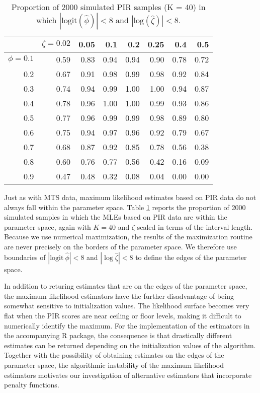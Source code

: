 \documentclass[man, noextraspace, floatsintext]{apa6}\usepackage[]{graphicx}\usepackage[]{color}
\newcommand{\logit}{\text{logit}}
\begin{document}
\begin{table}[b]
\centering
\caption{Proportion of 2000 simulated PIR samples (K = 40) in which  $|\text{logit}(\hat\phi)| < 8$ and $|\text{log}(\hat\zeta)| < 8$.} 
\label{tab:PIR_ests_valid}
\begin{tabular}{rrrrrrrr}
  \hline
 & $\zeta = 0.02$ & 0.05 & 0.1 & 0.2 & 0.25 & 0.4 & 0.5 \\ 
  \hline
$\phi = 0.1$ & 0.59 & 0.83 & 0.94 & 0.94 & 0.90 & 0.78 & 0.72 \\ 
  0.2 & 0.67 & 0.91 & 0.98 & 0.99 & 0.98 & 0.92 & 0.84 \\ 
  0.3 & 0.74 & 0.94 & 0.99 & 1.00 & 1.00 & 0.94 & 0.87 \\ 
  0.4 & 0.78 & 0.96 & 1.00 & 1.00 & 0.99 & 0.93 & 0.86 \\ 
  0.5 & 0.77 & 0.96 & 0.99 & 0.99 & 0.98 & 0.89 & 0.80 \\ 
  0.6 & 0.75 & 0.94 & 0.97 & 0.96 & 0.92 & 0.79 & 0.67 \\ 
  0.7 & 0.68 & 0.87 & 0.92 & 0.85 & 0.78 & 0.56 & 0.38 \\ 
  0.8 & 0.60 & 0.76 & 0.77 & 0.56 & 0.42 & 0.16 & 0.09 \\ 
  0.9 & 0.47 & 0.48 & 0.32 & 0.08 & 0.04 & 0.00 & 0.00 \\ 
   \hline
\end{tabular}
\end{table}


Just as with MTS data, maximum likelihood estimates based on PIR data do not always fall within the parameter space. Table \ref{tab:PIR_ests_valid} reports the proportion of 2000 simulated samples in which the MLEs based on PIR data are within the parameter space, again with $K = 40$ and $\zeta$ scaled in terms of the interval length. Because we use numerical maximization, the results of the maximization routine are never precisely on the borders of the parameter space. We therefore use boundaries of $|\logit \ \hat\phi| < 8$ and $|\log \hat\zeta| < 8$ to define the edges of the parameter space.

In addition to returing estimates that are on the edges of the parameter space, the maximum likelihood estimators have the further disadvantage of being somewhat sensitive to initialization values. The likelihood surface becomes very flat when the PIR scores are near ceiling or floor levels, making it difficult to numerically identify the maximum. For the implementation of the estimators in the accompanying R package, the consequence is that drastically different estimates can be returned depending on the initialization values of the algorithm. Together with the possibility of obtaining estimates on the edges of the parameter space, the algorithmic instability of the maximum likelihood estimators motivates our investigation of alternative estimators that incorporate penalty functions.  
\end{document}
